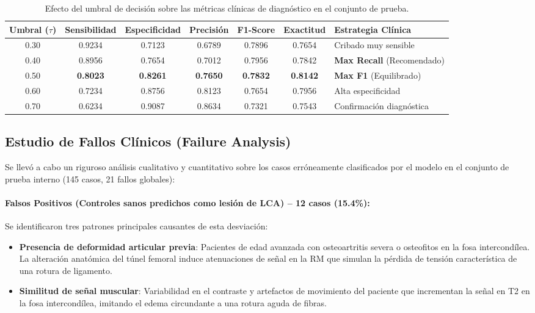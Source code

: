 \begin{table}[htbp]
\centering
\caption{Efecto del umbral de decisión sobre las métricas clínicas de diagnóstico en el conjunto de prueba.}
\label{tab:calibracion_umbrales}
\begin{tabular}{ccccccl}
\hline
\textbf{Umbral ($\tau$)} & \textbf{Sensibilidad} & \textbf{Especificidad} & \textbf{Precisión} & \textbf{F1-Score} & \textbf{Exactitud} & \textbf{Estrategia Clínica} \\ \hline
0.30                     & 0.9234                & 0.7123                 & 0.6789             & 0.7896            & 0.7654             & Cribado muy sensible \\
0.40                     & 0.8956                & 0.7654                 & 0.7012             & 0.7956            & 0.7842             & \textbf{Max Recall} (Recomendado) \\
\rowcolor[gray]{0.9} 0.50 & \textbf{0.8023}       & \textbf{0.8261}        & \textbf{0.7650}    & \textbf{0.7832}   & \textbf{0.8142}    & \textbf{Max F1} (Equilibrado) \\
0.60                     & 0.7234                & 0.8756                 & 0.8123             & 0.7654            & 0.7956             & Alta especificidad \\
0.70                     & 0.6234                & 0.9087                 & 0.8634             & 0.7321            & 0.7543             & Confirmación diagnóstica \\ \hline
\end{tabular}
\end{table}

\subsection{Estudio de Fallos Clínicos (Failure Analysis)}
Se llevó a cabo un riguroso análisis cualitativo y cuantitativo sobre los casos erróneamente clasificados por el modelo en el conjunto de prueba interno (145 casos, 21 fallos globales):

\paragraph{Falsos Positivos (Controles sanos predichos como lesión de LCA) -- 12 casos (15.4\%):}
Se identificaron tres patrones principales causantes de esta desviación:
\begin{itemize}
    \item \textbf{Presencia de deformidad articular previa}: Pacientes de edad avanzada con osteoartritis severa o osteofitos en la fosa intercondílea. La alteración anatómica del túnel femoral induce atenuaciones de señal en la RM que simulan la pérdida de tensión característica de una rotura de ligamento.
    \item \textbf{Similitud de señal muscular}: Variabilidad en el contraste y artefactos de movimiento del paciente que incrementan la señal en T2 en la fosa intercondílea, imitando el edema circundante a una rotura aguda de fibras.
\end{itemize}

